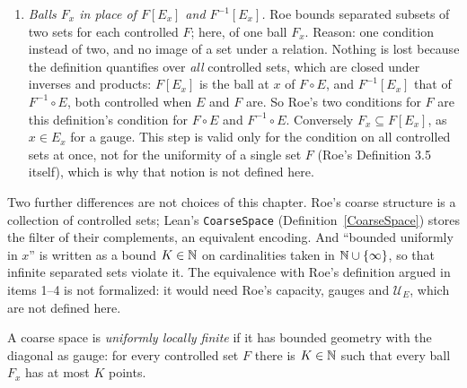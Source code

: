 \begin{enumerate}
        user would have to carry and check, and they do not change which sets are separated.
        A set is $E$-separated when no two \emph{distinct} points of it are $E$-related in
        either order (\texttt{SetRel.IsSeparated}); so adding $E^{-1}$ or $\Delta$ to $E$ does
        not change the $E$-separated sets. Hence if $E$ satisfies the definition, so does the
        controlled gauge $E \cup E^{-1} \cup \Delta$, with the same constants; and a gauge in
        Roe's sense is in particular a controlled set. The one place where Roe uses that a
        gauge contains $\Delta$ is item 4.
  \item \emph{Balls $F_x$ in place of $F[E_x]$ and $F^{-1}[E_x]$.} Roe bounds separated
        subsets of two sets for each controlled $F$; here, of one ball $F_x$. Reason: one
        condition instead of two, and no image of a set under a relation. Nothing is lost
        because the definition quantifies over \emph{all} controlled sets, which are closed
        under inverses and products: $F[E_x]$ is the ball at $x$ of $F \circ E$, and
        $F^{-1}[E_x]$ that of $F^{-1} \circ E$, both controlled when $E$ and $F$ are. So Roe's
        two conditions for $F$ are this definition's condition for $F \circ E$ and
        $F^{-1} \circ E$. Conversely $F_x \subseteq F[E_x]$, as $x \in E_x$ for a gauge.
        This step is valid only for the condition on all controlled sets at once, not for the
        uniformity of a single set $F$ (Roe's Definition 3.5 itself), which is why that
        notion is not defined here.
\end{enumerate}

Two further differences are not choices of this chapter. Roe's coarse structure is a
collection of controlled sets; Lean's \texttt{CoarseSpace} (Definition~\ref{CoarseSpace})
stores the filter of their complements, an equivalent encoding. And ``bounded uniformly in
$x$'' is written as a bound $K \in \mathbb{N}$ on cardinalities taken in $\mathbb{N} \cup \{\infty\}$, so that
infinite separated sets violate it. The equivalence with Roe's definition argued in items 1--4
is not formalized: it would need Roe's capacity, gauges and $\mathcal{U}_E$, which are
not defined here.

\begin{definition}
  \label{CoarseSpace.IsUniformlyLocallyFinite}
  A coarse space is \emph{uniformly locally finite} if it has bounded geometry with the
  diagonal as gauge: for every controlled set $F$ there is $K \in \mathbb{N}$ such that every ball
  $F_x$ has at most $K$ points.
\end{definition}

